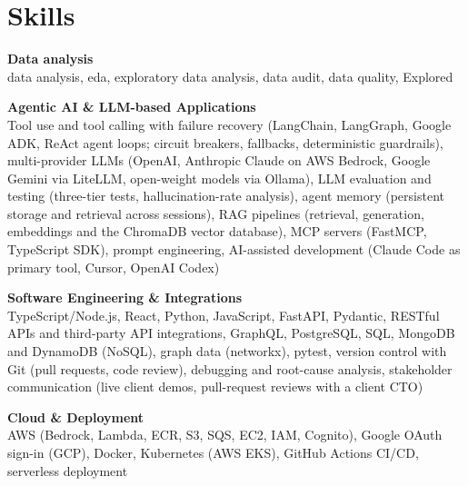 \documentclass[a4paper,11pt]{article}
\newcommand{\skillgroup}[2]{{\color{headernavy}\textbf{#1}}\\ #2\par\vspace{3pt}}
\begin{document}
\section{Skills}
\skillgroup{Data analysis}{data analysis, eda, exploratory data analysis, data audit, data quality, Explored}
\skillgroup{Agentic AI \& LLM-based Applications}{Tool use and tool calling with failure recovery (LangChain, LangGraph, Google ADK, ReAct agent loops; circuit breakers, fallbacks, deterministic guardrails), multi-provider LLMs (OpenAI, Anthropic Claude on AWS Bedrock, Google Gemini via LiteLLM, open-weight models via Ollama), LLM evaluation and testing (three-tier tests, hallucination-rate analysis), agent memory (persistent storage and retrieval across sessions), RAG pipelines (retrieval, generation, embeddings and the ChromaDB vector database), MCP servers (FastMCP, TypeScript SDK), prompt engineering, AI-assisted development (Claude Code as primary tool, Cursor, OpenAI Codex)}
\skillgroup{Software Engineering \& Integrations}{TypeScript/Node.js, React, Python, JavaScript, FastAPI, Pydantic, RESTful APIs and third-party API integrations, GraphQL, PostgreSQL, SQL, MongoDB and DynamoDB (NoSQL), graph data (networkx), pytest, version control with Git (pull requests, code review), debugging and root-cause analysis, stakeholder communication (live client demos, pull-request reviews with a client CTO)}
\skillgroup{Cloud \& Deployment}{AWS (Bedrock, Lambda, ECR, S3, SQS, EC2, IAM, Cognito), Google OAuth sign-in (GCP), Docker, Kubernetes (AWS EKS), GitHub Actions CI/CD, serverless deployment}
\end{document}
